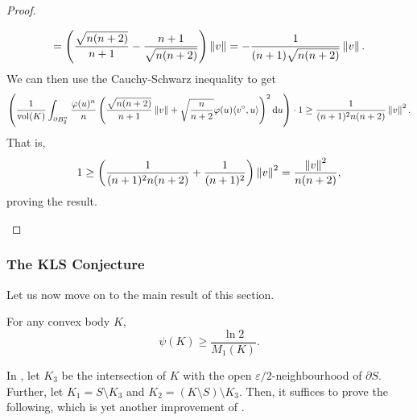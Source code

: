 \begin{proof}
\begin{itemize}
\begin{multline*}
					= \left(\frac{\sqrt{n(n+2)}}{n+1} - \frac{n+1}{\sqrt{n(n+2)}}\right)\left\lVert v\right\rVert = -\frac{1}{(n+1)\sqrt{n(n+2)}}\left\lVert v\right\rVert.
				\end{multline*}
				We can then use the Cauchy-Schwarz inequality to get
				\[ \left( \frac{1}{\operatorname{vol}(K)} \int_{\partial B_2^n} \frac{\varphi(u)^n}{n} \left(\frac{\sqrt{n(n+2)}}{n+1}\left\lVert v\right\rVert + \sqrt{\frac{n}{n+2}}\varphi(u)\langle v^\circ, u\rangle\right)^2 \operatorname{d}\!{u} \right) \cdot 1 \geq \frac{1}{(n+1)^2n(n+2)}\left\lVert v\right\rVert^2. \]
				That is,
				\[ 1 \geq \left(\frac{1}{(n+1)^2n(n+2)} + \frac{1}{(n+1)^2}\right)\left\lVert v\right\rVert^2 = \frac{\left\lVert v\right\rVert^2}{n(n+2)}, \]
				proving the result.
			\end{itemize}	
		\end{proof}

	\subsubsection{The KLS Conjecture}

		Let us now move on to the main result of this section.

		\begin{ftheo}
			\label{isoperimetric coefficient bound 1}
			For any convex body $K$,
			\[ \psi(K) \geq \frac{\ln 2}{M_1(K)}. \]
		\end{ftheo}

		In , let $K_3$ be the intersection of $K$ with the open $\varepsilon/2$-neighbourhood of $\partial S$. Further, let $K_1 = S\setminus K_3$ and $K_2 = (K\setminus S)\setminus K_3$. Then, it suffices to prove the following, which is yet another improvement of .

